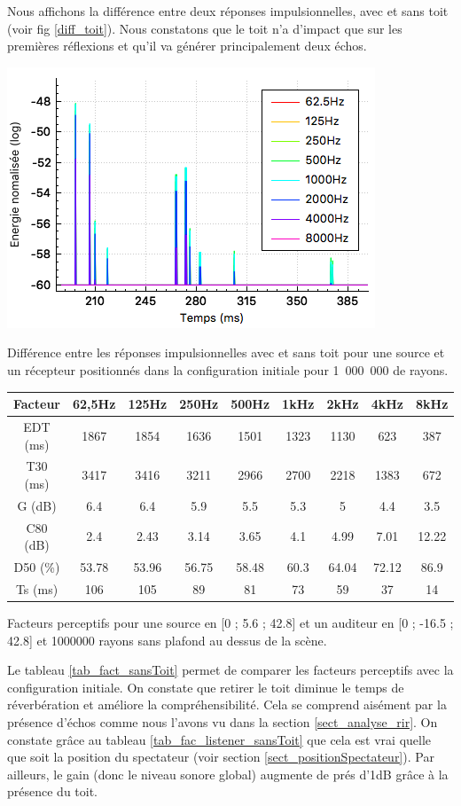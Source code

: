 Nous affichons la différence entre deux réponses impulsionnelles, avec et sans toit (voir fig \ref{diff_toit}). Nous constatons que le toit n'a d'impact que sur les premières réflexions et qu'il va générer principalement deux échos.
%
\begin{figureth}
	\includegraphics[width=0.6\linewidth]{images/diff_toit}
	\caption{Différence entre les réponses impulsionnelles avec et sans toit pour une source et un récepteur positionnés dans la configuration initiale pour 1~000~000 de rayons.}
	\label{diff_toit}
\end{figureth}
%
\begin{tableth}
 \begin{tabular}{| *{9}{c|}} 
 \hline 
 Facteur & 62,5Hz & 125Hz & 250Hz & 500Hz & 1kHz & 2kHz & 4kHz & 8kHz \\ 
 \hline 
 \hline 
\gls{EDT} (ms)& 1867& 1854& 1636& 1501& 1323& 1130& 623& 387 \\ 
 \hline 
\gls{T30} (ms)& 3417& 3416& 3211& 2966& 2700& 2218& 1383& 672 \\ 
 \hline 
\gls{G} (dB)& 6.4& 6.4& 5.9& 5.5& 5.3& 5& 4.4& 3.5 \\ 
 \hline 
\gls{C80} (dB)& 2.4& 2.43& 3.14& 3.65& 4.1& 4.99& 7.01& 12.22 \\ 
 \hline 
\gls{D50} (\%)& 53.78& 53.96& 56.75& 58.48& 60.3& 64.04& 72.12& 86.9 \\ 
 \hline 
\gls{Ts} (ms)& 106& 105& 89& 81& 73& 59& 37& 14 \\ 
 \hline 
\end{tabular} 
 \caption{Facteurs perceptifs pour une source en [0 ; 5.6 ; 42.8] et un auditeur en [0 ; -16.5 ; 42.8] et 1000000 rayons sans plafond au dessus de la scène.}
 \label{tab_fact_sansToit} 
 \end{tableth}
 
 Le tableau \ref{tab_fact_sansToit} permet de comparer les facteurs perceptifs avec la configuration initiale. On constate que retirer le toit diminue le temps de réverbération et améliore la compréhensibilité. Cela se comprend aisément par la présence d'échos comme nous l'avons vu dans la section \ref{sect_analyse_rir}. On constate grâce au tableau \ref{tab_fac_listener_sansToit} que cela est vrai quelle que soit la position du spectateur (voir section \ref{sect_positionSpectateur}). Par ailleurs, le gain (donc le niveau sonore global) augmente de prés d'1dB grâce à la présence du toit. 
 
